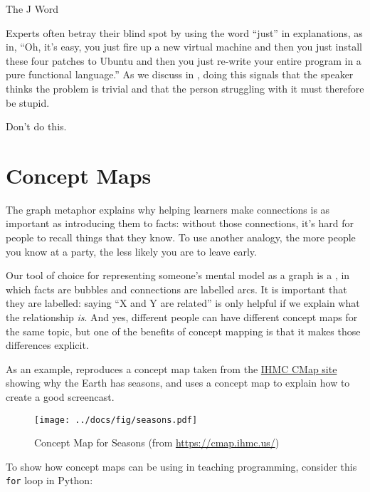 \begin{callout}{The J Word}

  Experts often betray their blind spot by using the word ``just'' in
  explanations, as in, ``Oh, it's easy, you just fire up a new virtual
  machine and then you just install these four patches to Ubuntu and
  then you just re-write your entire program in a pure functional
  language.''  As we discuss in , doing this
  signals that the speaker thinks the problem is trivial and that the
  person struggling with it must therefore be stupid.

  Don't do this.

\end{callout}

\section{Concept Maps}\label{s:memory-concept-maps}

The graph metaphor explains why helping learners make connections is
as important as introducing them to facts: without those connections,
it's hard for people to recall things that they know.  To use another
analogy, the more people you know at a party, the less likely you are
to leave early.

Our tool of choice for representing someone's mental model as a graph
is a , in which facts are bubbles
and connections are labelled arcs. It is important that they are
labelled: saying ``X and Y are related'' is only helpful if we explain
what the relationship \emph{is}. And yes, different people can have
different concept maps for the same topic, but one of the benefits of
concept mapping is that it makes those differences explicit.

As an example,  reproduces a concept map
taken from the \href{https://cmap.ihmc.us/}{IHMC CMap site} showing
why the Earth has seasons, and  uses a
concept map to explain how to create a good screencast.

\begin{figure}
\centering
\texttt{[image: ../docs/fig/seasons.pdf]}
\caption{Concept Map for Seasons (from \url{https://cmap.ihmc.us/})}
\label{f:memory-seasons}
\end{figure}

To show how concept maps can be using in teaching programming,
consider this \texttt{for} loop in Python:

